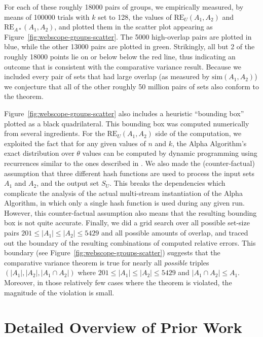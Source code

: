 \documentclass{article}
\begin{document}
For each of these roughly 18000 pairs of groups, we empirically
measured, by means of 100000 trials with $k$ set to 128,
the values of $\mathrm{RE}_U(A_1,A_2)$ and
$\mathrm{RE}_{A*}(A_1,A_2)$, and plotted them in the scatter plot
appearing as Figure~\ref{fig:webscope-groups-scatter}.
The 5000 high-overlap pairs are plotted in blue, while the other 13000
pairs are plotted in green.  Strikingly, all but 2 of the roughly
18000 points lie on or below below the red line, thus indicating an
outcome that is consistent with the comparative variance result.
Because we included every pair of sets that had large overlap
(as measured by $\textrm{sim}(A_1,A_2)$) we conjecture that all of the
other roughly 50 million pairs of sets also conform to the theorem.





Figure~\ref{fig:webscope-groups-scatter} also includes a heuristic
``bounding box'' plotted as a black quadrilateral.
This bounding box was computed numerically from
several ingredients.  For the $\mathrm{RE}_U(A_1,A_2)$ side of the
computation, we exploited the fact that for any given values of $n$
and $k$, the Alpha Algorithm's exact distribution over $\theta$ values
can be computed by dynamic programming using recurrences similar to
the ones described in \cite{flajolet1985approximate}.  
We also made
the (counter-factual) assumption that three different hash functions are
used to process the input sets $A_1$ and $A_2$, and the output set
$S_U$. This breaks the dependencies which complicate the analysis of the actual
multi-stream instantiation of the Alpha Algorithm, in which only a single hash
function is used during any given run. However, this counter-factual
assumption also means that the resulting bounding
box is not quite accurate. Finally, we did a grid search over
all possible set-size pairs
$201 \le |A_1| \le |A_2| \le 5429$ and all
possible amounts of overlap, and traced out the boundary of the
resulting combinations of computed relative errors.
This boundary (see Figure~\ref{fig:webscope-groups-scatter}) suggests
that the comparative variance theorem is true for nearly all {\em possible} triples
$(|A_1|,|A_2|,|A_1 \cap A_2|)$ where $201 \le |A_1| \le |A_2| \le 5429$ and
$|A_1 \cap A_2| \le A_1$. Moreover, in those relatively few
cases where the theorem is violated, the magnitude of the
violation is small.



\section{Detailed Overview of Prior Work}
\label{app:priorwork}
\end{document}
